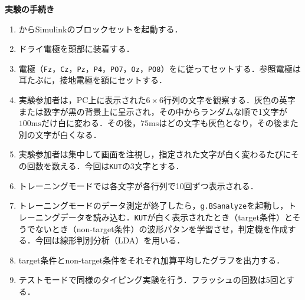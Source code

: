 \textbf{実験の手続き}
\begin{multicols}{2}
    \begin{enumerate}
        \item \matlab からSimulinkのブロックセットを起動する．
        \item ドライ電極を頭部に装着する．
        \item 電極（\texttt{Fz}，\texttt{Cz}，\texttt{Pz}，\texttt{P4}，\texttt{PO7}，\texttt{Oz}，\texttt{PO8}）をに従ってセットする．参照電極は耳たぶに，接地電極を額にセットする．
        \item 実験参加者は，PC上に表示された\(6\times6\)行列の文字を観察する．灰色の英字または数字が黒の背景上に呈示され，その中からランダムな順で1文字が\(100\textrm{ms}\)だけ白に変わる．その後，\(75\textrm{ms}\)はどの文字も灰色となり，その後また別の文字が白くなる．
        \item 実験参加者は集中して画面を注視し，指定された文字が白く変わるたびにその回数を数える．今回は\texttt{KUT}の3文字とする．
              \columnbreak
        \item トレーニングモードでは各文字が各行列で10回ずつ表示される．
        \item トレーニングモードのデータ測定が終了したら，\texttt{g.BSanalyze}を起動し，トレーニングデータを読み込む．\texttt{KUT}が白く表示されたとき（target条件）とそうでないとき（non-target条件）の波形パタンを学習させ，判定機を作成する．今回は線形判別分析（LDA）を用いる．
        \item target条件とnon-target条件をそれぞれ加算平均したグラフを出力する．
        \item テストモードで同様のタイピング実験を行う．フラッシュの回数は5回とする．
    \end{enumerate}
\end{multicols}
